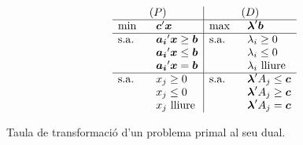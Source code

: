 \begin{table}[ht]
	\centering
	\setlength{\tabcolsep}{6ex}
	\renewcommand{\arraystretch}{1.5}
	\[
	\begin{array}{ll|ll}
		\multicolumn{2}{c|}{(P)}				
		&\multicolumn{2}{c}{(D)} \\
		\hline
		\min 	&\vb{c}'\vb{x}
		&\max 	&\vb{\lambda}'\vb{b}\\
		\hline
		\text{s.a.}\quad	&\vb{a_i}'\vb{x} \ge \vb{b}
		&\text{s.a.}\quad	&{\lambda_i} \ge 0\\
							&\vb{a_i}'\vb{x} \le \vb{b}
		&					&{\lambda_i} \le 0\\
							&\vb{a_i}'\vb{x} = \vb{b}
		&					&\lambda_i \text{ lliure}\\
		\hline
		\text{s.a.}\quad	&x_j \ge 0
		&\text{s.a.}\quad	&\vb{\lambda}'A_j \le \vb{c}\\
							&x_j \le 0
		&					&\vb{\lambda}'A_j \ge \vb{c}\\
							&x_j \text{ lliure}
		&					&\vb{\lambda}'A_j = \vb{c}\\
	\end{array}
	\]
	\caption{Taula de transformació d'un problema primal al seu dual.}\label{table:dual}
\end{table}

